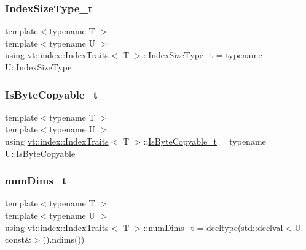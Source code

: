 \subsubsection{\texorpdfstring{Index\+Size\+Type\+\_\+t}{IndexSizeType\_t}}
{\footnotesize\ttfamily template$<$typename T $>$ \\
template$<$typename U $>$ \\
using \hyperlink{structvt_1_1index_1_1_index_traits}{vt\+::index\+::\+Index\+Traits}$<$ T $>$\+::\hyperlink{structvt_1_1index_1_1_index_traits_a583a777d70fc52ccfe1083acabc9640f}{Index\+Size\+Type\+\_\+t} =  typename U\+::\+Index\+Size\+Type}

\mbox{\label{structvt_1_1index_1_1_index_traits_a6869472628098b68d1ce678422814734}} 
\subsubsection{\texorpdfstring{Is\+Byte\+Copyable\+\_\+t}{IsByteCopyable\_t}}
{\footnotesize\ttfamily template$<$typename T $>$ \\
template$<$typename U $>$ \\
using \hyperlink{structvt_1_1index_1_1_index_traits}{vt\+::index\+::\+Index\+Traits}$<$ T $>$\+::\hyperlink{structvt_1_1index_1_1_index_traits_a6869472628098b68d1ce678422814734}{Is\+Byte\+Copyable\+\_\+t} =  typename U\+::\+Is\+Byte\+Copyable}

\mbox{\label{structvt_1_1index_1_1_index_traits_a9c055598424a66789ec9a5986c2ace3a}} 
\subsubsection{\texorpdfstring{num\+Dims\+\_\+t}{numDims\_t}}
{\footnotesize\ttfamily template$<$typename T $>$ \\
template$<$typename U $>$ \\
using \hyperlink{structvt_1_1index_1_1_index_traits}{vt\+::index\+::\+Index\+Traits}$<$ T $>$\+::\hyperlink{structvt_1_1index_1_1_index_traits_a9c055598424a66789ec9a5986c2ace3a}{num\+Dims\+\_\+t} =  decltype(std\+::declval$<$U const\&$>$().ndims())}


